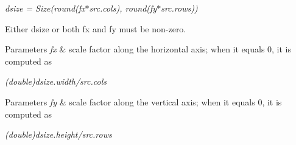 {\itshape dsize = Size(round(fx$\ast$src.cols), round(fy$\ast$src.rows))}

Either {\ttfamily dsize} or both {\ttfamily fx} and {\ttfamily fy} must be non-\/zero.


\begin{DoxyParams}{Parameters}
{\em fx} & scale factor along the horizontal axis; when it equals 0, it is computed as\\
\hline
\end{DoxyParams}


{\itshape (double)dsize.\+width/src.cols}


\begin{DoxyParams}{Parameters}
{\em fy} & scale factor along the vertical axis; when it equals 0, it is computed as\\
\hline
\end{DoxyParams}


{\itshape (double)dsize.\+height/src.rows}


